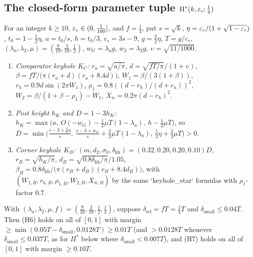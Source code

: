 \subsection{The closed-form parameter tuple $\Pi^*(k,\varepsilon_c;\frac14)$}\label{sec:pistar}

\begin{definition}\label{def:pistar}
For an integer $k\ge10$, $\varepsilon_c\in(0,\frac1{100}]$, and $f=\frac14$, put $s=\sqrt k$,
$\eta=\varepsilon_c/(1+\sqrt{1-\varepsilon_c})$, $t_0=1-\frac12\eta$, $a=t_0/s$, $h=t_0/3$, $c_s=3s-9$, $g=\frac32\eta$, $T=g/c_s$,
$(\lambda_a,\lambda_2,\mu)=(\frac9{10},\frac3{10},\frac12)$, $w_G=\lambda_a g$, $w_2=\lambda_2 g$, $\upsilon=\sqrt{11/1000}$.
\begin{enumerate}[label=(\arabic*)]
\item \emph{Comparator keyhole $K_C$:} $r_a=\sqrt{a/\pi}$, $d=\sqrt{fT/\pi}/(1+\upsilon)$,
$\beta=fT/\bigl(\pi(r_a+d)(r_a+8.4d)\bigr)$, $W_1=\beta/(3(1+\beta))$, $r_h=0.9d\sin(2\pi W_1)$,
$\rho_1=0.8((d-r_h)/(d+r_a))^2$, $W_2=\beta/(1+\beta-\rho_1)-W_1$, $X_w=0.2\pi(d-r_h)^2$.
\item \emph{Post height $h_K$ and $D=1-3h_K$:}
$h_K=\max\bigl(a,\ O(-w_G)-\frac12\mu T(1-\lambda_a),\ h-\frac12\mu T\bigr)$, so
$D=\min\bigl(\frac{s-3+\frac32\eta}{s},\ \frac{s-3+w_G}{s}+\frac32\mu T(1-\lambda_a),\ \frac12\eta+\frac32\mu T\bigr)>0$.
\item \emph{Corner keyhole $K_B$:} $(m,d_2,\sigma_0,\delta_{\mathrm{kh}})=(0.32,0.20,0.20,0.10)D$,
$r_B=\sqrt{h_K/\pi}$, $d_B=\sqrt{0.8\delta_{\mathrm{kh}}/\pi}/1.05$,
$\beta_B=0.8\delta_{\mathrm{kh}}/\bigl(\pi(r_B+d_B)(r_B+8.4d_B)\bigr)$, with $(W_{1,B},r_{h,B},\rho_{1,B},W_{2,B},X_{w,B})$
by the same `keyhole\_star` formulas with $\rho_1$-factor $0.7$.
\end{enumerate}
\end{definition}



\begin{lemma}\label{lem:h67}
With $(\lambda_a,\lambda_2,\mu,f)=(\frac9{10},\frac3{10},\frac12,\frac14)$, suppose $\delta_{\mathrm{rel}}=fT=\frac14T$
and $\delta_{\mathrm{small}}\le0.04T$. Then (H6) holds on all of $[0,1]$ with margin $\ge\min(0.05T-\delta_{\mathrm{small}},0.0128T)\ge0.01T$
(and $>0.0128T$ whenever $\delta_{\mathrm{small}}\le0.037T$, as for $\Pi^*$ below where $\delta_{\mathrm{small}}<0.007T$),
and (H7) holds on all of $[0,1]$ with margin $\ge0.10T$.
\end{lemma}

